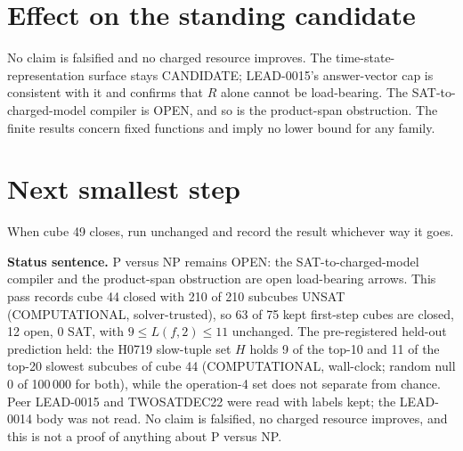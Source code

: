 \documentclass[11pt]{article}
\begin{document}
\section*{Effect on the standing candidate}
No claim is falsified and no charged resource improves. The time-state-representation surface stays CANDIDATE; LEAD-0015's answer-vector cap is consistent with it and confirms that $R$ alone cannot be load-bearing. The SAT-to-charged-model compiler is OPEN, and so is the product-span obstruction. The finite results concern fixed functions and imply no lower bound for any family.

\section*{Next smallest step}
When cube 49 closes, run  unchanged and record the result whichever way it goes.

\bigskip
\noindent\textbf{Status sentence.} P versus NP remains OPEN: the SAT-to-charged-model compiler and the product-span obstruction are open load-bearing arrows. This pass records cube 44 closed with 210 of 210 subcubes UNSAT (COMPUTATIONAL, solver-trusted), so 63 of 75 kept first-step cubes are closed, 12 open, 0 SAT, with $9\le L(f,2)\le 11$ unchanged. The pre-registered held-out prediction held: the H0719 slow-tuple set $H$ holds 9 of the top-10 and 11 of the top-20 slowest subcubes of cube 44 (COMPUTATIONAL, wall-clock; random null 0 of 100\,000 for both), while the operation-4 set does not separate from chance. Peer LEAD-0015 and TWOSATDEC22 were read with labels kept; the LEAD-0014 body was not read. No claim is falsified, no charged resource improves, and this is not a proof of anything about P versus NP.
\end{document}
